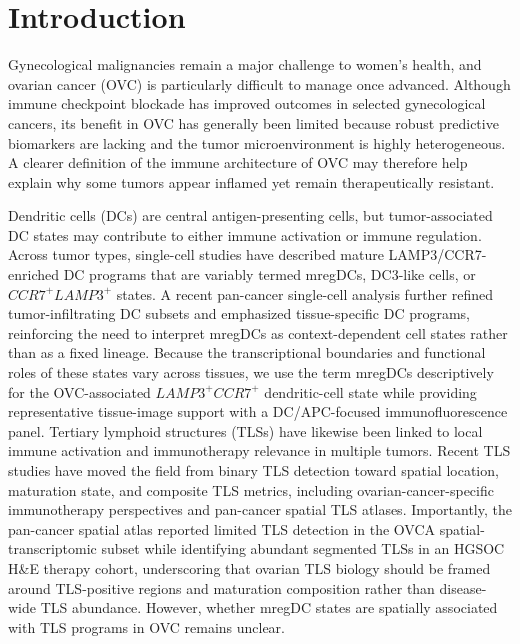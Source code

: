 \documentclass[cancers,article,submit,pdftex,moreauthors]{Definitions/mdpi}
\begin{document}
\section{Introduction}
Gynecological malignancies remain a major challenge to women's health, and ovarian cancer (OVC) is particularly difficult to manage once advanced. Although immune checkpoint blockade has improved outcomes in selected gynecological cancers, its benefit in OVC has generally been limited because robust predictive biomarkers are lacking and the tumor microenvironment is highly heterogeneous\cite{bib1,bib3,bib4,bib5,bib6,bib7,bib8}. A clearer definition of the immune architecture of OVC may therefore help explain why some tumors appear inflamed yet remain therapeutically resistant.

Dendritic cells (DCs) are central antigen-presenting cells, but tumor-associated DC states may contribute to either immune activation or immune regulation\cite{bib14,bib15,bib16}. Across tumor types, single-cell studies have described mature LAMP3/CCR7-enriched DC programs that are variably termed mregDCs, DC3-like cells, or $CCR7^{+}LAMP3^{+}$ states\cite{bib17,bib19,bib20}. A recent pan-cancer single-cell analysis further refined tumor-infiltrating DC subsets and emphasized tissue-specific DC programs, reinforcing the need to interpret mregDCs as context-dependent cell states rather than as a fixed lineage\cite{bib123}. Because the transcriptional boundaries and functional roles of these states vary across tissues, we use the term mregDCs descriptively for the OVC-associated $LAMP3^{+}CCR7^{+}$ dendritic-cell state while providing representative tissue-image support with a DC/APC-focused immunofluorescence panel. Tertiary lymphoid structures (TLSs) have likewise been linked to local immune activation and immunotherapy relevance in multiple tumors\cite{bib32,bib33}. Recent TLS studies have moved the field from binary TLS detection toward spatial location, maturation state, and composite TLS metrics, including ovarian-cancer-specific immunotherapy perspectives and pan-cancer spatial TLS atlases\cite{bib118,bib119,bib122}. Importantly, the pan-cancer spatial atlas reported limited TLS detection in the OVCA spatial-transcriptomic subset while identifying abundant segmented TLSs in an HGSOC H\&E therapy cohort, underscoring that ovarian TLS biology should be framed around TLS-positive regions and maturation composition rather than disease-wide TLS abundance\cite{bib118}. However, whether mregDC states are spatially associated with TLS programs in OVC remains unclear.
\end{document}
